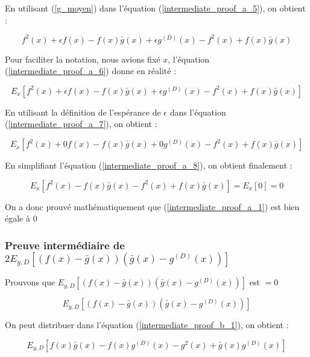 \documentclass[a4paper]{article}
\begin{document}
En utilisant (\ref{g_moyen}) dans l'équation (\ref{intermediate_proof_a_5}), on obtient :

\begin{equation}
\label{intermediate_proof_a_6}
f^2(x) + \epsilon f(x) - f(x)\bar{g}(x) + \epsilon g^{(D)}(x) - f^2(x) + f(x)\bar{g}(x)
\end{equation}

Pour faciliter la notation, nous avions fixé $x$, l'équation (\ref{intermediate_proof_a_6})  donne en réalité :

\begin{equation}
\label{intermediate_proof_a_7}
E_x[f^2(x) + \epsilon f(x) - f(x)\bar{g}(x) + \epsilon g^{(D)}(x) - f^2(x) + f(x)\bar{g}(x)]
\end{equation}

En utilisant la définition de l'espérance de $\epsilon$ dans l'équation (\ref{intermediate_proof_a_7}), on obtient :

\begin{equation}
\label{intermediate_proof_a_8}
E_x[f^2(x) + 0 f(x) - f(x)\bar{g}(x) + 0 g^{(D)}(x) - f^2(x) + f(x)\bar{g}(x)]
\end{equation}

En simplifiant l'équation (\ref{intermediate_proof_a_8}), on obtient finalement :

\begin{equation}
\label{intermediate_proof_a_9}
E_x[f^2(x) - f(x)\bar{g}(x) - f^2(x) + f(x)\bar{g}(x)] = E_x[0] = 0
\end{equation}

On a donc prouvé mathématiquement que (\ref{intermediate_proof_a_1}) est bien égale à 0
\newpage

\subsubsection{Preuve intermédiaire de $2E_{y,D} [(f(x)-\bar{g}(x)) (\bar{g}(x) - g^{(D)}(x)) ]$}
\label{intermediate_proof_b_subsection}
Prouvons que $E_{y,D} [(f(x)-\bar{g}(x)) (\bar{g}(x) - g^{(D)}(x)) ]$ est $= 0$ 

\begin{equation}
	\label{intermediate_proof_b_1}
	E_{y,D} [(f(x)-\bar{g}(x)) (\bar{g}(x) - g^{(D)}(x)) ]
\end{equation}

On peut distribuer dans l'équation (\ref{intermediate_proof_b_1}), on obtient :

\begin{equation}
		\label{intermediate_proof_b_2}
	E_{y,D} [ f(x)\bar{g}(x) - f(x)g^{(D)}(x) -g^2(x) + \bar{g}(x)g^{(D)}(x)]
\end{equation}
\end{document}
